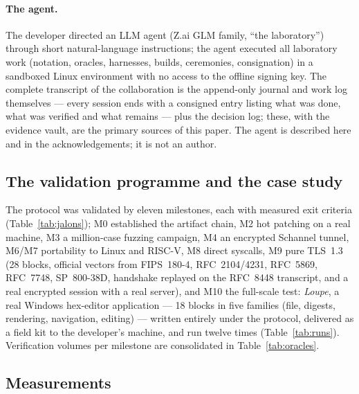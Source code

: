 \documentclass[11pt,a4paper]{article}
\begin{document}
\paragraph{The agent.}
The developer directed an LLM agent (Z.ai GLM family, ``the laboratory'')
through short natural-language instructions; the agent executed all
laboratory work (notation, oracles, harnesses, builds, ceremonies,
consignation) in a sandboxed Linux environment with no access to the
offline signing key. The complete transcript of the collaboration is the
append-only journal and work log themselves --- every session ends with a
consigned entry listing what was done, what was verified and what remains
--- plus the decision log; these, with the evidence vault, are the
primary sources of this paper. The agent is described here and in the
acknowledgements; it is not an author.

\subsection{The validation programme and the case study}\label{sec:cas}

The protocol was validated by eleven milestones, each with measured exit
criteria (Table~\ref{tab:jalons}); M0 established the artifact chain,
M2 hot patching on a real machine, M3 a million-case fuzzing campaign,
M4 an encrypted Schannel tunnel, M6/M7 portability to Linux and RISC-V,
M8 direct syscalls, M9 pure TLS~1.3 (28 blocks, official vectors from
FIPS~180-4, RFC~2104/4231, RFC~5869, RFC~7748, SP~800-38D, handshake
replayed on the RFC~8448 transcript, and a real encrypted session with a
real server), and M10 the full-scale test: \emph{Loupe}, a real Windows
hex-editor application --- 18 blocks in five families (file, digests,
rendering, navigation, editing) --- written entirely under the protocol,
delivered as a field kit to the developer's machine, and run twelve times
(Table~\ref{tab:runs}). Verification volumes per milestone are
consolidated in Table~\ref{tab:oracles}.

\subsection{Measurements}\label{sec:mesures}
\end{document}
